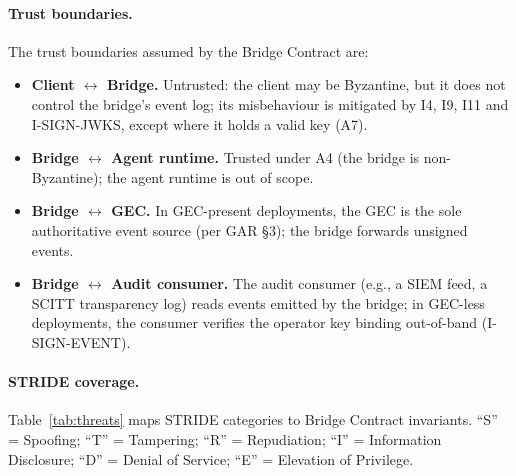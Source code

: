 \paragraph{Trust boundaries.} The trust boundaries assumed by the
Bridge Contract are:
\begin{itemize}[leftmargin=2em]
\item \textbf{Client $\leftrightarrow$ Bridge.} Untrusted: the
client may be Byzantine, but it does not control the bridge's event log;
its misbehaviour is mitigated by I4, I9, I11 and I-SIGN-JWKS, except where it
holds a valid key (A7).
\item \textbf{Bridge $\leftrightarrow$ Agent runtime.} Trusted
under A4 (the bridge is non-Byzantine); the agent runtime is
out of scope.
\item \textbf{Bridge $\leftrightarrow$ GEC.} In GEC-present
deployments, the GEC is the sole authoritative event source
(per GAR \S 3); the bridge forwards unsigned events.
\item \textbf{Bridge $\leftrightarrow$ Audit consumer.} The audit
consumer (e.g., a SIEM feed, a SCITT transparency log) reads
events emitted by the bridge; in GEC-less deployments, the
consumer verifies the operator key binding out-of-band
(I-SIGN-EVENT).
\end{itemize}

\paragraph{STRIDE coverage.} Table~\ref{tab:threats} maps STRIDE
categories to Bridge Contract invariants. ``S'' = Spoofing;
``T'' = Tampering; ``R'' = Repudiation; ``I'' = Information
Disclosure; ``D'' = Denial of Service; ``E'' = Elevation of
Privilege.

